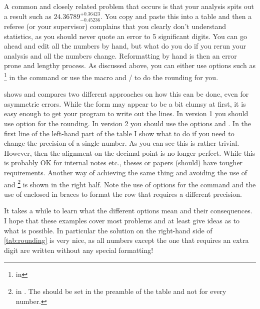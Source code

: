 A common and closely related problem that occurs is that your analysis
spits out a result such as \(24.36789^{+0.36423}_{-0.45236}\). You copy
and paste this into a table and then a referee (or your supervisor)
complains that you clearly don't understand statistics, as you should
never quote an error to 5 significant digits. You can go ahead and
edit all the numbers by hand, but what do you do if you rerun your
analysis and all the numbers change. Reformatting by hand is then an
error prone and lengthy process. As discussed above, you can either
use options such as \footnote{ in
  } in the  command or use the macro
 and / to do the
rounding for you.

 shows and compares two different approaches
on how this can be done, even for asymmetric errors. While the form
may appear to be a bit clumsy at first, it is easy enough to get your
program to write out the lines. In  version 1 you
should use option  for the rounding. In version 2 you
should use the options  and
. In the first line of the left-hand part of
the table I show what to do if you need to change the precision of a
single number.  As you can see this is rather trivial. However, then
the alignment on the decimal point is no longer perfect. While this is
probably OK for internal notes etc., theses or papers (should) have
tougher requirements. Another way of achieving the same thing and
avoiding the use of  and
\footnote{ in . The
   should be set in the preamble of the table and
  not for every number.} is shown in the right half. Note the use of
options for the  command and the use of  enclosed
in braces to format the row that requires a different precision.

It takes a while to learn what the different options mean and their
consequences. I hope that these examples cover most problems and at
least give ideas as to what is possible.  In particular the solution
on the right-hand side of \cref{tab:rounding} is very nice, as
all numbers except the one that requires an extra digit are written
without any special formatting!

